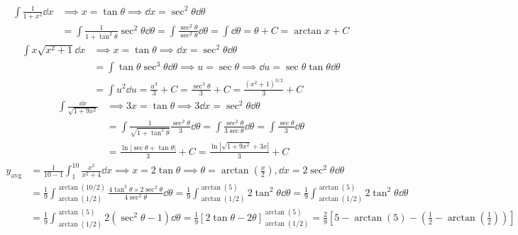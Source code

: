 \documentclass{article}
\newcommand{\subt}[1]{_{\text{#1}}}
\begin{document}
		\begin{tasks}[style = enumerate]
			\task
				\begin{align*}
					\int \frac{1}{1 + x^2} \dd{x} &\implies x = \tan\theta
							\implies \dd{x} = \sec^2\theta\dd{\theta} \\
						&= \int \frac{1}{1 + \tan^2\theta}\sec^2\theta \dd{\theta}
							= \int\frac{\sec^2\theta}{\sec^2\theta} \dd{\theta} 
							= \int \dd{\theta}
							= \theta + C
							= \arctan x + C
				\end{align*}
			\task
				\begin{align*}
					\int x\sqrt{x^2 + 1} \dd{x} &\implies x = \tan\theta 
							\implies \dd{x} = \sec^2\theta\dd{\theta} \\
						&= \int \tan\theta\sec^3\theta \dd{\theta}
							\implies u = \sec\theta
							\implies \dd{u} = \sec\theta\tan\theta\dd{\theta} \\
						&= \int u^2 \dd{u}
							= \frac{u^3}{3} + C
							= \frac{\sec^3\theta}{3} + C
							= \frac{(x^2 + 1)^{3/2}}{3} + C
				\end{align*}
			\task
			\task
				\begin{align*}
					\int \frac{\dd{x}}{\sqrt{1 + 9x^2}} &\implies 3x = \tan\theta
							\implies 3\dd{x} = \sec^2\theta\dd{\theta} \\
						&= \int \frac{1}{\sqrt{1 + \tan^2\theta}}\frac{\sec^2\theta}{3} \dd{\theta}
							= \int \frac{\sec^2\theta}{3\sec\theta} \dd{\theta}
							= \int \frac{\sec\theta}{3} \dd{\theta} \\
						&= \frac{\ln|\sec\theta + \tan\theta|}{3} + C
							= \frac{\ln|\sqrt{1 + 9x^2} + 3x|}{3} + C
				\end{align*}
			\task
				\begin{align*}
					 y\subt{avg} &= \frac{1}{10 - 1} \int_1^{10} \frac{x^2}{x^2 + 4} \dd{x}
					 		\implies x = 2\tan\theta
					 		\implies \theta = \arctan(\frac{x}{2}), \dd{x} = 2\sec^2\theta\dd{\theta} \\
					 	&= \frac{1}{9}\int_{\arctan(1/2)}^{\arctan(10/2)} \frac{4\tan^2\theta \times 2\sec^2\theta}{4\sec^2\theta} \dd{\theta}
					 		= \frac{1}{9}\int_{\arctan(1/2)}^{\arctan(5)} 2\tan^2\theta \dd{\theta} 
					 		= \frac{1}{9}\int_{\arctan(1/2)}^{\arctan(5)} 2\tan^2\theta \dd{\theta} \\
					 	&= \frac{1}{9}\int_{\arctan(1/2)}^{\arctan(5)} 2(\sec^2\theta - 1) \dd{\theta}
					 		= \frac{1}{9}[2\tan\theta - 2\theta]_{\arctan(1/2)}^{\arctan(5)}
					 		= \frac{2}{9}\left[5 - \arctan(5) - \left(\frac{1}{2} - \arctan(\frac{1}{2})\right)\right]

\end{align*}
\end{tasks}
\end{document}
